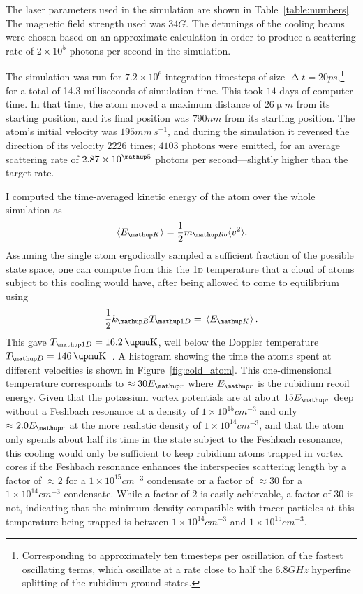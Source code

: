 The laser parameters used in the simulation are shown in Table~\ref{table:numbers}. The magnetic field strength used was $34\unit{G}$. The detunings of the cooling beams were chosen based on an approximate calculation in order to produce a scattering rate of $2\times10^{5}$ photons per second in the simulation.

The simulation was run for $7.2\times10^6$ integration timesteps of size $\upDelta t=20\unit{ps}$,\footnote{Corresponding to approximately ten timesteps per oscillation of the fastest oscillating terms, which oscillate at a rate close to half the $6.8\unit{GHz}$ hyperfine splitting of the rubidium ground states.} for a total of 14.3 milliseconds of simulation time. This took $14$ days of computer time. In that time, the atom moved a maximum distance of $26\unit{\upmu m}$ from its starting position, and its final position was $790\unit{nm}$ from its starting position. The atom's initial velocity was $195 \unit{mm\,s}^{-1}$, and during the simulation it reversed the direction of its velocity $2226$ times; $4103$ photons were emitted, for an average scattering rate of $2.87\times10^\up{5}$ photons per second---slightly higher than the target rate.

I computed the time-averaged kinetic energy of the atom over the whole simulation as
\begin{equation}
\ev{E_\up{K}} = \frac12 m_\up{Rb} \langle v^2 \rangle.
\end{equation}
Assuming the single atom ergodically sampled a sufficient fraction of the possible state space, one can compute from this the \textsc{1d} temperature that a cloud of atoms subject to this cooling would have, after being allowed to come to equilibrium using
\begin{align}
\frac12 k_\up{B} T_\up{1D} = \ev{E_\up{K}}.
\end{align}
This gave $T_\up{1D} = 16.2\unit{\upmu K}$, well below the Doppler temperature $T_\up{D} = 146\unit{\upmu K}$~\cite{steck_rubidium_2015}. A histogram showing the time the atoms spent at different velocities is shown in Figure~\ref{fig:cold_atom}. This one-dimensional temperature corresponds to $\approx30E_\up{r}$ where $E_\up{r}$ is the rubidium recoil energy. Given that the potassium vortex potentials are at about $15E_\up{r}$ deep without a Feshbach resonance at a density of $1\times10^{15}\unit{cm}^{-3}$ and only $\approx 2.0E_\up{r}$ at the more realistic density of $1\times10^{14}\unit{cm}^{-3}$, and that the atom only spends about half its time in the state subject to the Feshbach resonance, this cooling would only be sufficient to keep rubidium atoms trapped in vortex cores if the Feshbach resonance enhances the interspecies scattering length by a factor of $\approx 2$ for a $1\times10^{15}\unit{cm}^{-3}$ condensate or a factor of $\approx 30$ for a $1\times10^{14}\unit{cm}^{-3}$ condensate. While a factor of $2$ is easily achievable, a factor of $30$ is not, indicating that the minimum density compatible with tracer particles at this temperature being trapped is between $1\times10^{14}\unit{cm}^{-3}$ and $1\times10^{15}\unit{cm}^{-3}$.

